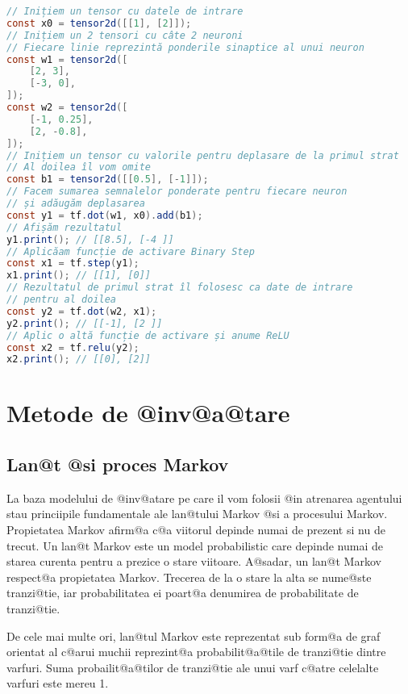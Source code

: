 \begin{lstlisting}[language=Java, caption=Exemple de folosire a bibliotecii Tensorflow, label={lst:exemple-tensor-nn}]
// Inițiem un tensor cu datele de intrare
const x0 = tensor2d([[1], [2]]);
// Inițiem un 2 tensori cu câte 2 neuroni
// Fiecare linie reprezintă ponderile sinaptice al unui neuron
const w1 = tensor2d([
    [2, 3],
    [-3, 0],
]);
const w2 = tensor2d([
    [-1, 0.25],
    [2, -0.8],
]);
// Inițiem un tensor cu valorile pentru deplasare de la primul strat
// Al doilea îl vom omite
const b1 = tensor2d([[0.5], [-1]]);
// Facem sumarea semnalelor ponderate pentru fiecare neuron
// și adăugăm deplasarea
const y1 = tf.dot(w1, x0).add(b1);
// Afișăm rezultatul
y1.print(); // [[8.5], [-4 ]]
// Aplicăam funcție de activare Binary Step
const x1 = tf.step(y1);
x1.print(); // [[1], [0]]
// Rezultatul de primul strat îl folosesc ca date de intrare
// pentru al doilea
const y2 = tf.dot(w2, x1);
y2.print(); // [[-1], [2 ]]
// Aplic o altă funcție de activare și anume ReLU
const x2 = tf.relu(y2);
x2.print(); // [[0], [2]]
\end{lstlisting}

\chapter{Metode de @inv@a@tare}

\section{Lan@t @si proces Markov}


La baza modelului de @inv@atare pe care il vom folosii @in atrenarea agentului stau princiipile fundamentale ale lan@tului Markov @si a procesului Markov.
Propietatea Markov afirm@a c@a viitorul depinde numai de prezent si nu de trecut. Un lan@t Markov este un model probabilistic care depinde numai de starea curenta pentru a prezice o stare viitoare. A@sadar, un lan@t Markov respect@a propietatea Markov.
Trecerea de la o stare la alta se nume@ste tranzi@tie, iar probabilitatea ei poart@a denumirea de probabilitate de tranzi@tie.

De cele mai multe ori, lan@tul Markov este reprezentat sub form@a de graf orientat al c@arui muchii reprezint@a probabilit@a@tile de tranzi@tie dintre varfuri. Suma probailit@a@tilor de tranzi@tie ale unui varf c@atre celelalte varfuri este mereu 1.


